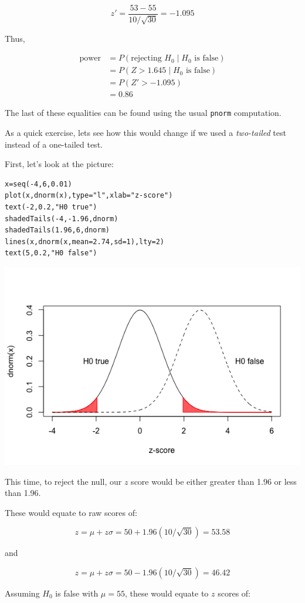 \documentclass[11pt]{article}
\begin{document}
\[
z'=\frac{53-55}{10/\sqrt{30}}=-1.095
\]

Thus, 

\begin{align*}
 \text{power} &= P(\text{rejecting }H_0 \mid H_0 \text{ is false})\\
 & = P(Z>1.645 \mid H_0\text{ is false})\\
 & = P(Z'>-1.095)\\
 & = 0.86
\end{align*}

The last of these equalities can be found using the usual \texttt{pnorm} computation.


As a quick exercise, lets see how this would change if we used a \emph{two-tailed} test instead of a one-tailed test.

First, let's look at the picture:

\begin{verbatim}
x=seq(-4,6,0.01)
plot(x,dnorm(x),type="l",xlab="z-score")
text(-2,0.2,"H0 true")
shadedTails(-4,-1.96,dnorm)
shadedTails(1.96,6,dnorm)
lines(x,dnorm(x,mean=2.74,sd=1),lty=2)
text(5,0.2,"H0 false")
\end{verbatim}

\includegraphics[width=.9\linewidth]{figures/week4/twoTailed2.png}

This time, to reject the null, our $z$ score would be either greater than 1.96 or less than 1.96.  

These would equate to raw scores of:

\[
z=\mu+z\sigma = 50+1.96(10/\sqrt{30})=53.58
\]

and

\[
z=\mu+z\sigma = 50-1.96(10/\sqrt{30})=46.42
\]

Assuming $H_0$ is false with $\mu=55$, these would equate to $z$ scores of:
\end{document}
